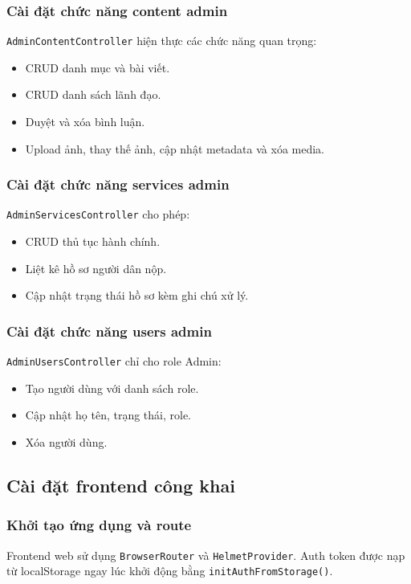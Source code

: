 \documentclass[12pt,a4paper]{article}
\begin{document}
\subsubsection{Cài đặt chức năng content admin}
\texttt{AdminContentController} hiện thực các chức năng quan trọng:
\begin{itemize}[leftmargin=1.1cm]
  \item CRUD danh mục và bài viết.
  \item CRUD danh sách lãnh đạo.
  \item Duyệt và xóa bình luận.
  \item Upload ảnh, thay thế ảnh, cập nhật metadata và xóa media.
\end{itemize}

\subsubsection{Cài đặt chức năng services admin}
\texttt{AdminServicesController} cho phép:
\begin{itemize}[leftmargin=1.1cm]
  \item CRUD thủ tục hành chính.
  \item Liệt kê hồ sơ người dân nộp.
  \item Cập nhật trạng thái hồ sơ kèm ghi chú xử lý.
\end{itemize}

\subsubsection{Cài đặt chức năng users admin}
\texttt{AdminUsersController} chỉ cho role Admin:
\begin{itemize}[leftmargin=1.1cm]
  \item Tạo người dùng với danh sách role.
  \item Cập nhật họ tên, trạng thái, role.
  \item Xóa người dùng.
\end{itemize}

\subsection{Cài đặt frontend công khai}

\subsubsection{Khởi tạo ứng dụng và route}
Frontend web sử dụng \texttt{BrowserRouter} và \texttt{HelmetProvider}. Auth token được nạp từ localStorage ngay lúc khởi động bằng \texttt{initAuthFromStorage()}.
\end{document}
